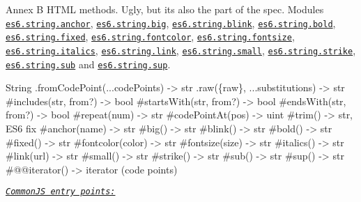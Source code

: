 Annex B H\+T\+ML methods. Ugly, but it\textquotesingle{}s also the part of the spec. Modules \href{https://github.com/zloirock/core-js/blob/v2.6.0/modules/es6.string.anchor.js}{\tt {\ttfamily es6.\+string.\+anchor}}, \href{https://github.com/zloirock/core-js/blob/v2.6.0/modules/es6.string.big.js}{\tt {\ttfamily es6.\+string.\+big}}, \href{https://github.com/zloirock/core-js/blob/v2.6.0/modules/es6.string.blink.js}{\tt {\ttfamily es6.\+string.\+blink}}, \href{https://github.com/zloirock/core-js/blob/v2.6.0/modules/es6.string.bold.js}{\tt {\ttfamily es6.\+string.\+bold}}, \href{https://github.com/zloirock/core-js/blob/v2.6.0/modules/es6.string.fixed.js}{\tt {\ttfamily es6.\+string.\+fixed}}, \href{https://github.com/zloirock/core-js/blob/v2.6.0/modules/es6.string.fontcolor.js}{\tt {\ttfamily es6.\+string.\+fontcolor}}, \href{https://github.com/zloirock/core-js/blob/v2.6.0/modules/es6.string.fontsize.js}{\tt {\ttfamily es6.\+string.\+fontsize}}, \href{https://github.com/zloirock/core-js/blob/v2.6.0/modules/es6.string.italics.js}{\tt {\ttfamily es6.\+string.\+italics}}, \href{https://github.com/zloirock/core-js/blob/v2.6.0/modules/es6.string.link.js}{\tt {\ttfamily es6.\+string.\+link}}, \href{https://github.com/zloirock/core-js/blob/v2.6.0/modules/es6.string.small.js}{\tt {\ttfamily es6.\+string.\+small}}, \href{https://github.com/zloirock/core-js/blob/v2.6.0/modules/es6.string.strike.js}{\tt {\ttfamily es6.\+string.\+strike}}, \href{https://github.com/zloirock/core-js/blob/v2.6.0/modules/es6.string.sub.js}{\tt {\ttfamily es6.\+string.\+sub}} and \href{https://github.com/zloirock/core-js/blob/v2.6.0/modules/es6.string.sup.js}{\tt {\ttfamily es6.\+string.\+sup}}. 
\begin{DoxyCode}
String
  .fromCodePoint(...codePoints) -> str
  .raw(\{raw\}, ...substitutions) -> str
  #includes(str, from?) -> bool
  #startsWith(str, from?) -> bool
  #endsWith(str, from?) -> bool
  #repeat(num) -> str
  #codePointAt(pos) -> uint
  #trim() -> str, ES6 fix
  #anchor(name)     -> str
  #big()            -> str
  #blink()          -> str
  #bold()           -> str
  #fixed()          -> str
  #fontcolor(color) -> str
  #fontsize(size)   -> str
  #italics()        -> str
  #link(url)        -> str
  #small()          -> str
  #strike()         -> str
  #sub()            -> str
  #sup()            -> str
  #@@iterator() -> iterator (code points)
\end{DoxyCode}
 \href{#commonjs}{\tt {\itshape Common\+JS entry points\+:}} 

